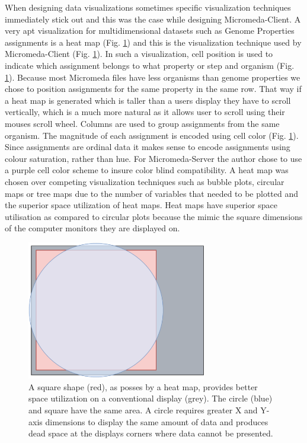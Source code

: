 When designing data visualizations sometimes specific visualization techniques immediately stick out and this was the case while designing Micromeda-Client. A very apt visualization for multidimensional datasets such as Genome Properties assignments is a heat map (Fig. \ref{fig:client-analysis-types}) and this is the visualization technique used by Micromeda-Client (Fig. \ref{fig:client-analysis-types}). In such a visualization, cell position is used to indicate which assignment belongs to what property or step and organism (Fig. \ref{fig:client-analysis-types}). Because most Micromeda files have less organisms than genome properties we chose to position assignments for the same property in the same row. That way if a heat map is generated which is taller than a users display they have to scroll vertically, which is a much more natural as it allows user to scroll using their mouses scroll wheel. Columns are used to group assignments from the same organism. The magnitude of each assignment is encoded using cell color (Fig. \ref{fig:client-analysis-types}). Since assignments are ordinal data it makes sense to encode assignments using colour saturation, rather than hue. For Micromeda-Server the author chose to use a purple cell color scheme to insure color blind compatibility. A heat map was chosen over competing visualization techniques such as bubble plots, circular maps or tree maps due to the number of variables that needed to be plotted and the superior space utilization of heat maps. Heat maps have superior space utilisation as compared to circular plots because the mimic the square dimensions of the computer monitors they are displayed on.

\begin{figure}[!ht]
  \centering
	\includegraphics[width=0.7\textwidth]{media/square_vs_circle.pdf}
	 \caption{A square shape (red), as posses by a heat map, provides better space utilization on a conventional display (grey). The circle (blue) and square have the same area. A circle requires greater X and Y-axis dimensions to display the same amount of data and produces dead space at the displays corners where data cannot be presented.}
	 \label{fig:client-analysis-types}
\end{figure}

